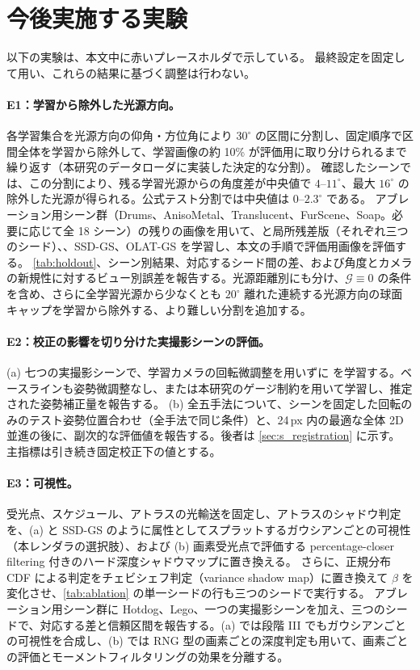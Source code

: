 \documentclass[10pt,twocolumn,letterpaper]{article}
\begin{document}
\section{今後実施する実験}
\label{sec:s_torun}
以下の実験は、本文中に赤いプレースホルダで示している。
最終設定を固定して用い、これらの結果に基づく調整は行わない。

\paragraph{E1：学習から除外した光源方向。}
各学習集合を光源方向の仰角・方位角により $30^\circ$ の区間に分割し、固定順序で区間全体を学習から除外して、学習画像の約 10\% が評価用に取り分けられるまで繰り返す（本研究のデータローダに実装した決定的な分割）。
確認したシーンでは、この分割により、残る学習光源からの角度差が中央値で $4$--$11^\circ$、最大 $16^\circ$ の除外した光源が得られる。公式テスト分割では中央値は $0$--$2.3^\circ$ である。
アブレーション用シーン群（Drums、AnisoMetal、Translucent、FurScene、Soap。必要に応じて全 18 シーン）の残りの画像を用いて、\ours と局所残差版（それぞれ三つのシード）、\gsthree、SSD-GS、OLAT-GS を学習し、本文の手順で評価用画像を評価する。
\cref{tab:holdout}、シーン別結果、対応するシード間の差、および角度とカメラの新規性に対するビュー別誤差を報告する。光源距離別にも分け、$\mathcal G\equiv0$ の条件を含め、さらに全学習光源から少なくとも $20^\circ$ 離れた連続する光源方向の球面キャップを学習から除外する、より難しい分割を追加する。

\paragraph{E2：校正の影響を切り分けた実撮影シーンの評価。}
(a) 七つの実撮影シーンで、学習カメラの回転微調整を用いずに \ours を学習する。ベースラインも姿勢微調整なし、または本研究のゲージ制約を用いて学習し、推定された姿勢補正量を報告する。
(b) 全五手法について、シーンを固定した回転のみのテスト姿勢位置合わせ（全手法で同じ条件）と、24\,px 内の最適な全体 2D 並進の後に、副次的な評価値を報告する。後者は \cref{sec:s_registration} に示す。
主指標は引き続き固定校正下の値とする。

\paragraph{E3：可視性。}
受光点、スケジュール、アトラスの光輸送を固定し、アトラスのシャドウ判定を、(a) \gsthree と SSD-GS のように属性としてスプラットするガウシアンごとの可視性（本レンダラの選択肢）、および (b) 画素受光点で評価する percentage-closer filtering 付きのハード深度シャドウマップに置き換える。
さらに、正規分布 CDF による判定をチェビシェフ判定（variance shadow map）に置き換えて $\beta$ を変化させ、\cref{tab:ablation} の単一シードの行も三つのシードで実行する。
アブレーション用シーン群に Hotdog、Lego、一つの実撮影シーンを加え、三つのシードで、対応する差と信頼区間を報告する。(a) では段階 III でもガウシアンごとの可視性を合成し、(b) では RNG 型の画素ごとの深度判定も用いて、画素ごとの評価とモーメントフィルタリングの効果を分離する。
\end{document}
